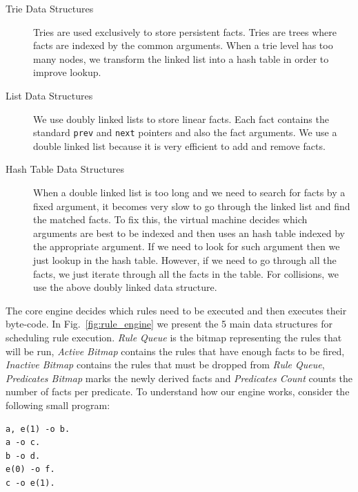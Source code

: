 \begin{description}
   \item[Trie Data Structures]

   Tries are used exclusively to store persistent facts.
   Tries are trees where facts are indexed by the common arguments. When a trie level has too many nodes, we
   transform the linked list into a hash table in order to improve lookup.
      
   \item[List Data Structures]
   
   We use doubly linked lists to store linear facts. Each fact contains the standard \texttt{prev} and \texttt{next} pointers
   and also the fact arguments. We use a double linked list because it is very efficient to add and remove facts.
   
   \item[Hash Table Data Structures]
   
   When a double linked list is too long and we need to search for facts by a fixed argument, it becomes very slow to go through the
   linked list and find the matched facts. To fix this, the virtual machine decides which arguments are best to be indexed and then
   uses an hash table indexed by the appropriate argument. If we need to look for such argument then we just lookup in the hash table. However,
   if we need to go through all the facts, we just iterate through all the facts in the table. For collisions, we use the above doubly linked
   data structure.
\end{description}

The core engine decides which rules need to be executed and then executes their byte-code.
In Fig.~\ref{fig:rule_engine} we present the 5 main data structures for scheduling rule execution.
\emph{Rule Queue} is the bitmap representing the rules that will be run, \emph{Active Bitmap} contains the rules that have enough
facts to be fired, \emph{Inactive Bitmap} contains the rules that must be dropped from \emph{Rule Queue}, \emph{Predicates Bitmap}
marks the newly derived facts and \emph{Predicates Count} counts the number of facts per predicate.
To understand how our engine works, consider
the following small program:

\begin{Verbatim}
a, e(1) -o b.
a -o c.
b -o d.
e(0) -o f.
c -o e(1).
\end{Verbatim}

